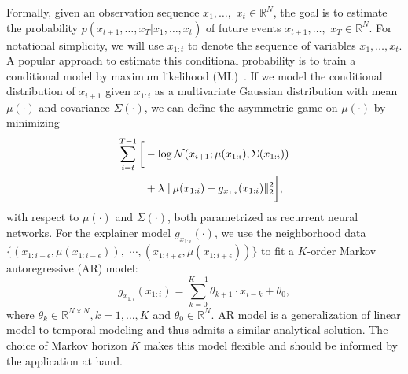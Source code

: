 Formally, given an observation sequence $x_{1},\dots,$ $x_{t}\in\mathbb{R}^N$, the goal is to estimate the probability $p(x_{t+1},\dots,x_{T} | x_{1},\dots,x_{t})$ of future events $x_{t+1},\dots,$ $x_{T}\in \mathbb{R}^N$. For notational simplicity, we will use ${x}_{1:t}$ to denote the sequence of variables $x_1,\dots,x_t$.
A popular approach to estimate this conditional probability is to train a conditional model by maximum likelihood (ML)~\cite{van2016wavenet}. 
If we model the conditional distribution of $x_{i+1}$ given ${x}_{1:i}$ as a multivariate Gaussian distribution with mean $\mu(\cdot)$ and covariance $\Sigma(\cdot)$, we can define the asymmetric game on $\mu(\cdot)$ by minimizing
\begin{align}
\vspace{-2mm}
\sum_{i=t}^{T-1} \bigg[& -\log \mathcal{N}(x_{i+1}; \mu({x}_{1:i}), \Sigma({x}_{1:i})) \nonumber \\
& + \lambda \; \|\mu({x}_{1:i}) - g_{{x}_{1:i}}({x}_{1:i})\|_2^2 \bigg],
\label{eq:implicit}
\end{align}
with respect to $\mu(\cdot)$ and $\Sigma(\cdot)$, both parametrized as recurrent neural networks.
For the explainer model $g_{{x}_{1:i}}(\cdot)$, we use the neighborhood data $\{({x}_{1:i-\epsilon}, \mu({x}_{1:i-\epsilon})),$ $\cdots,({x}_{1:i+\epsilon}, \mu({x}_{1:i+\epsilon}))\}$ to fit a $K$-order Markov autoregressive (AR) model: 
\begin{equation}
g_{x_{1:i}}(x_{1:i}) = \sum_{k=0}^{K-1} \theta_{k+1} \cdot x_{i-k} + \theta_0,
\label{eq:arma}
\end{equation}
where $\theta_k \in \mathbb{R}^{N \times N}, k=1,\dots,K$ and $\theta_0 \in \mathbb{R}^{N}$.
AR model is a generalization of linear model to temporal modeling and thus admits a similar analytical solution. The choice of Markov horizon $K$ makes this model flexible and should be informed by the application at hand.


